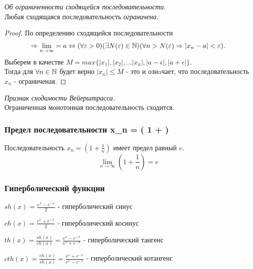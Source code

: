 \begin{theorem}
  \textit{Об ограниченности сходящейся последовательности}. \\ 
  Любая сходящаяся последовательность \textit{ограничена}. 
\end{theorem}

\begin{proof}
  По определению сходящейся последовательности 
  \begin{gather*}
    \implies \lim_{n \to \infty} = a \iff (\forall \epsilon > 0)(\exists N(\epsilon)\in \N)(\forall n > N(\epsilon) \implies |x_{n} - a| < \epsilon).
  \end{gather*}
  Выберем в качестве $M = max \{|x_{1}|, |x_2|, \ldots |x_n|, |a - \epsilon|, |a + \epsilon|\}$. \\
Тогда для $\forall n \in \mathbb{N}$ будет верно $|x_{n}| \le M$ - это и ознaчает, что последовательность $x_{n}$ - ограниченая.
\end{proof}

\begin{theorem}
  \textit{Признак сходимости Вейерштрасса}. \\
  Ограниченная монотонная последовательность сходится.
\end{theorem}

\subsubsection{Предел последовательности x_{n} = \left( 1 +  \right)}

\begin{theorem}
  Последовательность $x_{n} = \left( 1 + \frac{1}{n} \right) $ имеет предел равный $e$.
  \[
  \lim_{n \to \infty} \left( 1 + \frac{1}{n} \right) = e 
  \] 
\end{theorem}

\subsubsection{Гиперболический функции}

$sh\left( x \right) = \frac{e^x - e^{-x}}{2}$ - гиперболический синус

$ch\left( x \right) = \frac{e^x + e^{-x}}{2}$ - гиперболический косинус

$th\left( x \right) = \frac{sh(x)}{ch(x)} = \frac{e^x - e^{-x}}{e^x + e^{-x}}$ - гиперболический тангенс

$cth\left( x \right) = \frac{ch(x)}{sh(x)} = \frac{e^x + e^{-x}}{e^x - e^{-x}}$ - гиперболический котангенс

